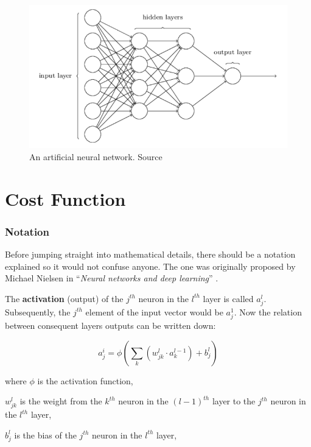 \begin{figure}[h]
    \centering
    \includegraphics[width=12cm]{img/ANN-diagram.png}
    \caption{An artificial neural network. Source \cite{NNandDL}}
    \label{fig:ann}
\end{figure}

\section{Cost Function}
\label{sec:cost-function}

\subsubsection*{Notation}
\label{sub2:notation}

Before jumping straight into mathematical details, there should be a notation explained so it would not confuse anyone. The one was originally proposed by Michael Nielsen in ``\emph{Neural networks and deep learning}'' \cite{NNandDL}.

The \textbf{activation} (output) of the $j^{th}$ neuron in the $l^{th}$ layer is called $a^l_j$. Subsequently, the $j^{th}$ element of the input vector would be $a^1_j$. Now the relation between consequent layers outputs can be written down:

\begin{equation}
\label{eq:2.1}
a^i_j = \phi\left(\sum_k (w^l_{jk} \cdot a^{l-1}_k) + b^l_j\right)
\end{equation}

where $\phi$ is the activation function,

$w^l_{jk}$ is the weight from the $k^{th}$ neuron in the $(l-1)^{th}$ layer to the $j^{th}$ neuron in the $l^{th}$ layer,

$b^l_j$ is the bias of the $j^{th}$ neuron in the $l^{th}$ layer,

